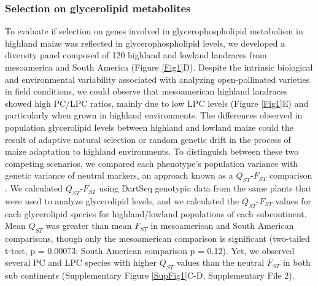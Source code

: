 \documentclass[9pt,twocolumn,twoside,lineno]{BioRxiv}
\begin{document}
\subsubsection{Selection on glycerolipid metabolites} 
To evaluate if selection on genes involved in glycerophospholipid metabolism in highland maize was reflected in glycerophospholipid levels, we developed a diversity panel composed of 120 highland and lowland landraces from mesoamerica and South America (Figure \ref{Fig1}D). 
Despite the intrinsic biological and environmental variability associated with analyzing open-pollinated varieties in field conditions, we could observe that mesoamerican highland landraces showed  high PC/LPC ratios, mainly due to low LPC levels (Figure \ref{Fig1}E) and particularly when grown in highland environments. 
The differences observed in population glycerolipid levels between highland and lowland maize could the result of adaptive natural selection or random genetic drift in the process of maize adaptation to highland environments.
To distinguish between these two competing scenarios, we compared each phenotype's population variance with genetic variance of neutral markers, an approach known as a $Q_{ST}$-$F_{ST}$ comparison \cite{Leinonen2013-ic}.
We calculated $Q_{ST}$-$F_{ST}$ using DartSeq genotypic data from the same plants that were used to analyze glycerolipid levels, and we calculated the $Q_{ST}$-$F_{ST}$ values for each glycerolipid species for highland/lowland populations of each subcontinent. 
Mean $Q_{ST}$ was greater than mean $F_{ST}$ in mesoamerican and South American comparisons, though only the mesoamerican comparison is significant (two-tailed t-test, p = 0.00073; South American comparison p = 0.12).
Yet, we observed several PC and LPC species with higher $Q_{ST}$ values than the neutral $F_{ST}$ in both sub continents (Supplementary Figure \ref{SupFig1}C-D, Supplementary File 2).
\end{document}
